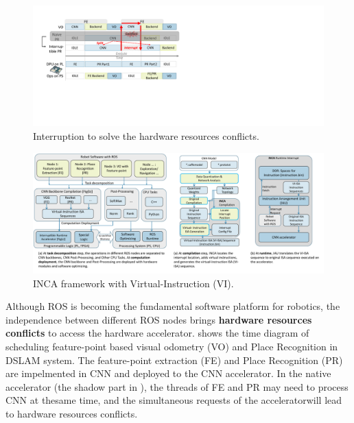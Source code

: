 
\begin{figure}[t]
	\centering
	\includegraphics[width=0.95\linewidth]{fig/interDPR.pdf}
    \caption{Interruption to solve the hardware resources conflicts.  
    }
	\label{fig:interDPR}
\end{figure}

\begin{figure}[t]
	\centering
	\includegraphics[width=0.95\linewidth]{fig/inca_acc.pdf}
    \caption{INCA framework with Virtual-Instruction (VI).  
    }
	\label{fig:inca_acc}
\end{figure}


 Although ROS is becoming the fundamental software platform for robotics, the independence between different ROS nodes brings \textbf{hardware resources conflicts} to access the hardware accelerator.  shows the time diagram of scheduling feature-point based visual odometry (VO) and Place Recognition in DSLAM system. The feature-point extraction (FE) and Place Recognition (PR) are impelmented in CNN and deployed to the CNN accelerator. In the native accelerator (the shadow part in  ), the  threads  of  FE  and  PR  may  need  to  process  CNN  at  thesame  time,  and  the  simultaneous  requests  of  the  acceleratorwill  lead  to  hardware  resources  conflicts. 

